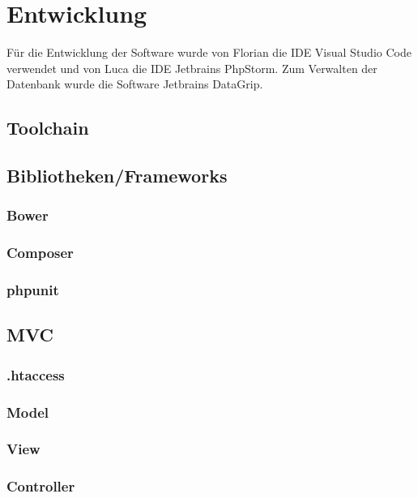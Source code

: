 \chapter{Entwicklung}\label{ch:entwicklung}
Für die Entwicklung der Software wurde von Florian die IDE Visual Studio Code verwendet und von Luca die IDE Jetbrains PhpStorm.
Zum Verwalten der Datenbank wurde die Software Jetbrains DataGrip.

\section{Toolchain}\label{sec:toolchain}

\section{Bibliotheken/Frameworks}\label{sec:bibliotheken/frameworks}
\subsection{Bower}\label{subsec:bower}
\subsection{Composer}\label{subsec:composer}
\subsection{phpunit}\label{subsec:phpunit}

\section{MVC}\label{sec:mvc}
\subsection{.htaccess}\label{subsec:.htaccess}
\subsection{Model}\label{subsec:model}
\subsection{View}\label{subsec:view}
\subsection{Controller}\label{subsec:controller}

